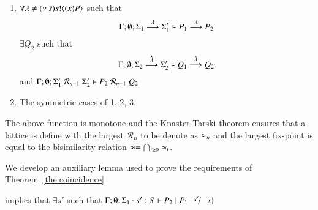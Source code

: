 \begin{definition}
\begin{itemize}
\begin{enumerate}
				\item	$\forall \lambda \not= (\nu\ \tilde{s}) s ! \langle (x)P \rangle$ such that
					\[
						\Gamma; \emptyset; \Sigma_1 \stackrel{\lambda}{\longrightarrow} \Sigma_1' \vdash P_1 \stackrel{\lambda}{\longrightarrow} P_2
					\]
					$\exists Q_2$ such that 
					\[
						\Gamma; \emptyset; \Sigma_2 \stackrel{\hat{\lambda}}{\longrightarrow} \Sigma_2' \vdash Q_1 \stackrel{\hat{\lambda}}{\Longrightarrow} Q_2
					\]
					and
					$\Gamma; \emptyset; \Sigma_1'\ \mathcal{R}_{n-1}\ \Sigma_2' \proves P_2\ \mathcal{R}_{n-1}\ Q_2$.

				\item	The symmetric cases of 1, 2, 3.
			\end{enumerate}
	\end{itemize}
	\noi The above function is monotone and the Knaster-Tarski theorem ensures that a lattice is define
	with the largest $\mathcal{R}_n$ to be denote as $\approx_n$ and the largest fix-point is equal to the
	bisimilarity relation $\approx = \bigcap_{i \geq 0} \approx_i$.
\end{definition}



We develop an auxiliary lemma used to prove
the requirements of Theorem~\ref{the:coincidence}.

\begin{lemma}\rm
	\label{lem:aux}
		\item
		implies that $\exists s'$ such that $\Gamma; \emptyset; \Sigma_1 \cat s': S \proves P_2 \Par P \subst{s'}{x}$
\end{lemma}

